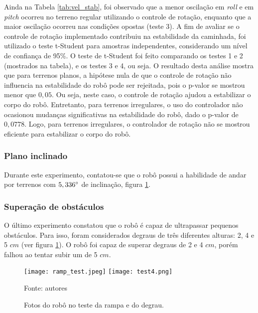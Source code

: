 \documentclass[../main.tex]{subfiles}
\begin{document}
  Ainda na Tabela \ref{tab:vel_stab}, foi observado que a menor oscilação em \textit{roll} e em \textit{pitch} ocorreu no terreno regular utilizando o controle de rotação, enquanto que a maior oscilação ocorreu nas condições opostas (teste 3). A fim de avaliar se o controle de rotação implementado contribuiu na estabilidade da caminhada, foi utilizado o teste t-Student para amostras independentes, considerando um nível de confiança de 95\%. O teste de t-Student foi feito comparando os testes 1 e 2 (mostrados na tabela), e os testes 3 e 4, ou seja. O resultado desta análise mostra que para terrenos planos, a hipótese nula de que o controle de rotação não influencia na estabilidade do robô pode ser rejeitada, pois o p-valor se mostrou menor que $0,05$. Ou seja, neste caso, o controle de rotação ajudou a estabilizar o corpo do robô. Entretanto, para terrenos irregulares, o uso do controlador não ocasionou mudanças significativas na estabilidade do robô, dado o p-valor de $0,0778$. Logo, para terrenos irregulares, o controlador de rotação não se mostrou eficiente para estabilizar o corpo do robô. 
    
  \subsubsection{Plano inclinado}
  Durante este experimento, contatou-se que o robô possui a habilidade de andar por terrenos com $5,336\degree$ de inclinação, figura \ref{fig:tests3-4}. 

  \subsubsection{Superação de obstáculos}
  O último experimento constatou que o robô é capaz de ultrapassar pequenos obstáculos. Para isso, foram considerados degraus de três diferentes alturas: 2, 4 e 5 $cm$ (ver figura \ref{fig:tests3-4}). O robô foi capaz de superar degraus de 2 e 4 $cm$, porém falhou ao tentar subir um de 5 $cm$.

  \begin{figure}[h]
    \centering
    \caption{Fotos do robô no teste da rampa e do degrau.}
    \texttt{[image: ramp\_test.jpeg]}
    \texttt{[image: test4.png]}

    Fonte: autores
    \label{fig:tests3-4}
  \end{figure}
\end{document}
